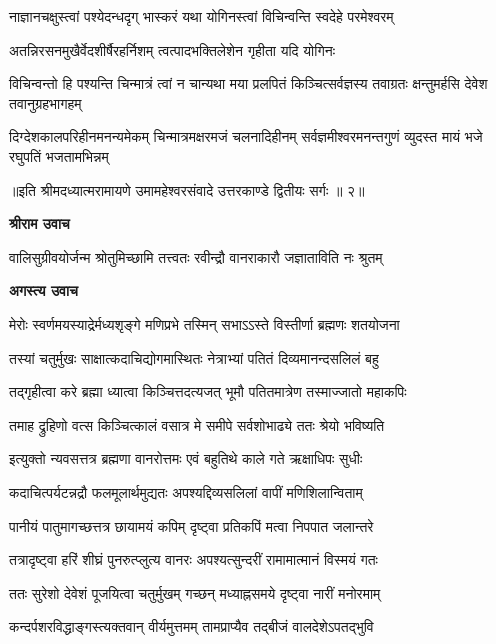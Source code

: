 \twolineshloka
{नाज्ञानचक्षुस्त्वां पश्येदन्धदृग् भास्करं यथा}
{योगिनस्त्वां विचिन्वन्ति स्वदेहे परमेश्वरम्} %

\twolineshloka
{अतन्निरसनमुखैर्वेदशीर्षैरहर्निशम्}
{त्वत्पादभक्तिलेशेन गृहीता यदि योगिनः} %

\threelineshloka
{विचिन्वन्तो हि पश्यन्ति चिन्मात्रं त्वां न चान्यथा}
{मया प्रलपितं किञ्चित्सर्वज्ञस्य तवाग्रतः}
{क्षन्तुमर्हसि देवेश तवानुग्रहभागहम्} %

\fourlineindentedshloka
{दिग्देशकालपरिहीनमनन्यमेकम्}
{चिन्मात्रमक्षरमजं चलनादिहीनम्}
{सर्वज्ञमीश्वरमनन्तगुणं व्युदस्त\-}
{मायं भजे रघुपतिं भजतामभिन्नम्} %

{॥इति श्रीमदध्यात्मरामायणे उमामहेश्वरसंवादे उत्तरकाण्डे द्वितीयः
सर्गः ॥ २॥
}




\textbf{श्रीराम उवाच}

\twolineshloka
{वालिसुग्रीवयोर्जन्म श्रोतुमिच्छामि तत्त्वतः}
{रवीन्द्रौ वानराकारौ जज्ञाताविति नः श्रुतम्} %

\textbf{अगस्त्य उवाच}

\twolineshloka
{मेरोः स्वर्णमयस्याद्रेर्मध्यशृङ्गे मणिप्रभे}
{तस्मिन् सभाऽऽस्ते विस्तीर्णा ब्रह्मणः शतयोजना} %

\twolineshloka
{तस्यां चतुर्मुखः साक्षात्कदाचिद्योगमास्थितः}
{नेत्राभ्यां पतितं दिव्यमानन्दसलिलं बहु} %

\twolineshloka
{तद्गृहीत्वा करे ब्रह्मा ध्यात्वा किञ्चित्तदत्यजत्}
{भूमौ पतितमात्रेण तस्माज्जातो महाकपिः} %

\twolineshloka
{तमाह द्रुहिणो वत्स किञ्चित्कालं वसात्र मे}
{समीपे सर्वशोभाढ्ये ततः श्रेयो भविष्यति} %

\twolineshloka
{इत्युक्तो न्यवसत्तत्र ब्रह्मणा वानरोत्तमः}
{एवं बहुतिथे काले गते ऋक्षाधिपः सुधीः} %

\twolineshloka
{कदाचित्पर्यटन्नद्रौ फलमूलार्थमुद्यतः}
{अपश्यद्दिव्यसलिलां वापीं मणिशिलान्विताम्} %

\twolineshloka
{पानीयं पातुमागच्छत्तत्र छायामयं कपिम्}
{दृष्ट्वा प्रतिकपिं मत्वा निपपात जलान्तरे} %

\twolineshloka
{तत्रादृष्ट्वा हरिं शीघ्रं पुनरुत्प्लुत्य वानरः}
{अपश्यत्सुन्दरीं रामामात्मानं विस्मयं गतः} %

\twolineshloka
{ततः सुरेशो देवेशं पूजयित्वा चतुर्मुखम्}
{गच्छन् मध्याह्नसमये दृष्ट्वा नारीं मनोरमाम्} %

\twolineshloka
{कन्दर्पशरविद्धाङ्गस्त्यक्तवान् वीर्यमुत्तमम्}
{तामप्राप्यैव तद्बीजं वालदेशेऽपतद्भुवि} %

